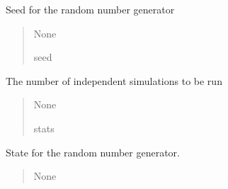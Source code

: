 \documentclass[letterpaper,10pt,english]{sphinxmanual}
\begin{document}
\begin{fulllineitems}
\begin{fulllineitems}
\label{\detokenize{lysis.util:lysis.util.parameters.MacroParameters.seed}}
\pysigstartsignatures
{}
\pysigstopsignatures
\sphinxAtStartPar
Seed for the random number generator
\begin{quote}\begin{description}
\sphinxAtStartPar
None

\sphinxAtStartPar
seed

\end{description}\end{quote}

\end{fulllineitems}


\begin{fulllineitems}
\label{\detokenize{lysis.util:lysis.util.parameters.MacroParameters.simulations}}
\pysigstartsignatures
{}
\pysigstopsignatures
\sphinxAtStartPar
The number of independent simulations to be run
\begin{quote}\begin{description}
\sphinxAtStartPar
None

\sphinxAtStartPar
stats

\end{description}\end{quote}

\end{fulllineitems}


\begin{fulllineitems}
\label{\detokenize{lysis.util:lysis.util.parameters.MacroParameters.state}}
\pysigstartsignatures
{}
\pysigstopsignatures
\sphinxAtStartPar
State for the random number generator.
\begin{quote}\begin{description}
\sphinxAtStartPar
None


\end{description}
\end{quote}
\end{fulllineitems}
\end{fulllineitems}
\end{document}
